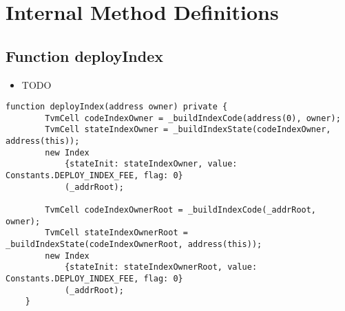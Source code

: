 \section{Internal Method Definitions}


\subsection{Function deployIndex}

\begin{itemize}
\item TODO
\end{itemize}

\begin{lstlisting}[firstnumber=63]
    function deployIndex(address owner) private {
        TvmCell codeIndexOwner = _buildIndexCode(address(0), owner);
        TvmCell stateIndexOwner = _buildIndexState(codeIndexOwner, address(this));
        new Index
            {stateInit: stateIndexOwner, value: Constants.DEPLOY_INDEX_FEE, flag: 0}
            (_addrRoot);

        TvmCell codeIndexOwnerRoot = _buildIndexCode(_addrRoot, owner);
        TvmCell stateIndexOwnerRoot = _buildIndexState(codeIndexOwnerRoot, address(this));
        new Index
            {stateInit: stateIndexOwnerRoot, value: Constants.DEPLOY_INDEX_FEE, flag: 0}
            (_addrRoot);
    }
\end{lstlisting}
